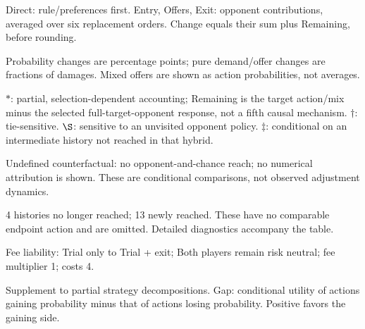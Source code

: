 \documentclass[10pt]{article}
\begin{document}
{\footnotesize Direct: rule/preferences first. Entry, Offers, Exit: opponent contributions, averaged over six replacement orders. Change equals their sum plus Remaining, before rounding.\par
Probability changes are percentage points; pure demand/offer changes are fractions of damages. Mixed offers are shown as action probabilities, not averages.\par
$*$: partial, selection-dependent accounting; Remaining is the target action/mix minus the selected full-target-opponent response, not a fifth causal mechanism. $\dagger$: tie-sensitive. $\S$: sensitive to an unvisited opponent policy. $\ddagger$: conditional on an intermediate history not reached in that hybrid.\par
Undefined counterfactual: no opponent-and-chance reach; no numerical attribution is shown. These are conditional comparisons, not observed adjustment dynamics.\par
4 histories no longer reached; 13 newly reached. These have no comparable endpoint action and are omitted. Detailed diagnostics accompany the table.}\par
{}\par
Fee liability: Trial only to Trial + exit; Both players remain risk neutral; fee multiplier 1; costs 4.\par
{\small Supplement to partial strategy decompositions. Gap: conditional utility of actions gaining probability minus that of actions losing probability. Positive favors the gaining side.}\par
\end{document}
